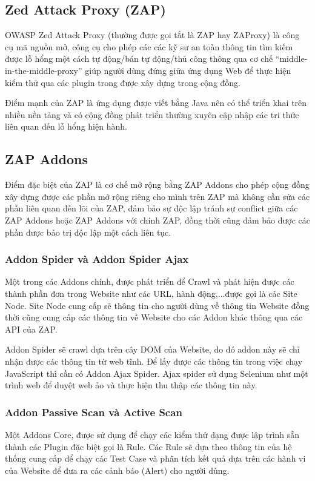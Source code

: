 \documentclass[./../main.tex]{subfiles}
\begin{document}
\subsection{Zed Attack Proxy (ZAP)}
OWASP Zed Attack Proxy (thường được gọi tắt là  ZAP hay ZAProxy) là công cụ mã nguồn mở, công cụ cho phép các các kỹ sư an toàn thông tin tìm kiếm được lỗ hổng một cách tự động/bán
tự động/thủ công thông qua cơ chế “middle-in-the-middle-proxy” giúp người dùng đứng giữa ứng dụng Web để thực hiện kiểm thử qua các plugin trong được xây dựng trong cộng đồng.

Điểm mạnh của ZAP là ứng dụng được viết bằng Java nên có thể triển khai trên nhiều nền tảng và có cộng đồng phát triển thường xuyên cập nhập các tri thức liên quan đến lỗ hổng hiện hành.

\subsection{ZAP Addons}
Điểm đặc biệt của ZAP là cơ chế mở rộng bằng ZAP Addons cho phép cộng đồng xây dựng được các phần mở rộng riêng cho mình trên ZAP mà không cần sửa các phần liên quan đến lõi của
ZAP, đảm bảo sự độc lập tránh sự conflict giữa các ZAP Addons hoặc ZAP Addons với chính ZAP, đồng thời cũng đảm bảo được các phần được bảo trị độc lập một cách liên tục.
\subsubsection{Addon Spider và Addon Spider Ajax}
Một trong các Addons chính, được phát triển để Crawl và phát hiện được các thành phần đơn trong Website như các URL, hành động,...được gọi là các Site Node. Site Node cung cấp sẽ
thông tin cho người dùng về thông tin Website đồng thời cũng cung cấp các thông tin về Website cho các Addon khác thông qua các API của ZAP.

Addon Spider sẽ crawl dựa trên cây DOM của Website, do đó addon này sẽ chỉ nhận được các thông tin từ web tĩnh. Để lấy được các thông tin trong việc chạy JavaScript thì cần có
Addon Ajax Spider. Ajax spider sử dụng Selenium như một trình web để duyệt web ảo và thực hiện thu thập các thông tin này.
\subsubsection{Addon Passive Scan và Active Scan}
Một Addons Core, được sử dụng để chạy các kiểm thử dạng được lập trình sẵn thành các Plugin đặc biệt gọi là Rule. Các Rule sẽ dựa theo thông tin của hệ thống cung cấp để
chạy các Test Case và phân tích kết quả dựa trên các hành vi của Website để đưa ra các cảnh báo (Alert) cho người dùng.
\end{document}
